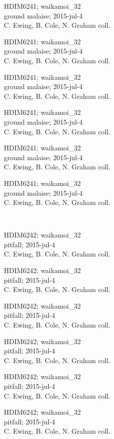 \documentclass[2pt]{extarticle}
\begin{document}
\noindent
\parbox{0.16\textwidth}{\tiny \raggedright \rule[-0.3\baselineskip]{0pt}{10pt}HDIM6241; waikamoi\_32\\ ground malaise; 2015-jul-4\\ C. Ewing, B. Cole, N. Graham coll.}
\parbox{0.16\textwidth}{\tiny \raggedright \rule[-0.3\baselineskip]{0pt}{10pt}HDIM6241; waikamoi\_32\\ ground malaise; 2015-jul-4\\ C. Ewing, B. Cole, N. Graham coll.}
\parbox{0.16\textwidth}{\tiny \raggedright \rule[-0.3\baselineskip]{0pt}{10pt}HDIM6241; waikamoi\_32\\ ground malaise; 2015-jul-4\\ C. Ewing, B. Cole, N. Graham coll.}
\parbox{0.16\textwidth}{\tiny \raggedright \rule[-0.3\baselineskip]{0pt}{10pt}HDIM6241; waikamoi\_32\\ ground malaise; 2015-jul-4\\ C. Ewing, B. Cole, N. Graham coll.}
\parbox{0.16\textwidth}{\tiny \raggedright \rule[-0.3\baselineskip]{0pt}{10pt}HDIM6241; waikamoi\_32\\ ground malaise; 2015-jul-4\\ C. Ewing, B. Cole, N. Graham coll.}
\parbox{0.16\textwidth}{\tiny \raggedright \rule[-0.3\baselineskip]{0pt}{10pt}HDIM6241; waikamoi\_32\\ ground malaise; 2015-jul-4\\ C. Ewing, B. Cole, N. Graham coll.} \\ 
\vspace{0.001in} 

\noindent
\parbox{0.16\textwidth}{\tiny \raggedright \rule[-0.3\baselineskip]{0pt}{10pt}HDIM6242; waikamoi\_32\\ pitfall; 2015-jul-4\\ C. Ewing, B. Cole, N. Graham coll.}
\parbox{0.16\textwidth}{\tiny \raggedright \rule[-0.3\baselineskip]{0pt}{10pt}HDIM6242; waikamoi\_32\\ pitfall; 2015-jul-4\\ C. Ewing, B. Cole, N. Graham coll.}
\parbox{0.16\textwidth}{\tiny \raggedright \rule[-0.3\baselineskip]{0pt}{10pt}HDIM6242; waikamoi\_32\\ pitfall; 2015-jul-4\\ C. Ewing, B. Cole, N. Graham coll.}
\parbox{0.16\textwidth}{\tiny \raggedright \rule[-0.3\baselineskip]{0pt}{10pt}HDIM6242; waikamoi\_32\\ pitfall; 2015-jul-4\\ C. Ewing, B. Cole, N. Graham coll.}
\parbox{0.16\textwidth}{\tiny \raggedright \rule[-0.3\baselineskip]{0pt}{10pt}HDIM6242; waikamoi\_32\\ pitfall; 2015-jul-4\\ C. Ewing, B. Cole, N. Graham coll.}
\parbox{0.16\textwidth}{\tiny \raggedright \rule[-0.3\baselineskip]{0pt}{10pt}HDIM6242; waikamoi\_32\\ pitfall; 2015-jul-4\\ C. Ewing, B. Cole, N. Graham coll.} \\ 
\vspace{0.001in} 
\end{document}
